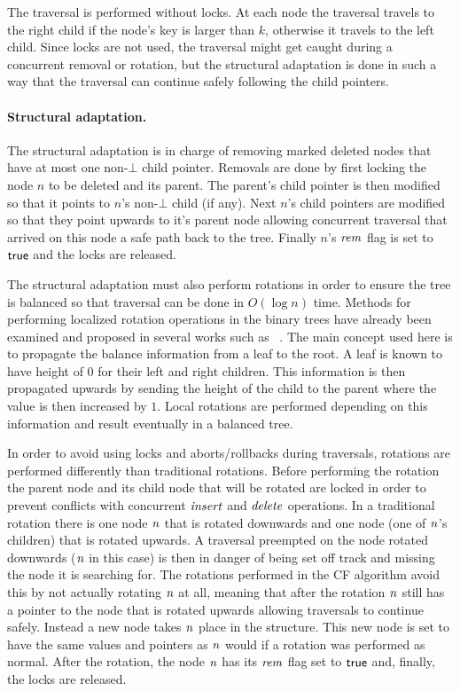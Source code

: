 The traversal is performed without locks.
At each node the traversal travels to the right child if the node's key is larger than $k$,
otherwise it travels to the left child.
Since locks are not used, the traversal might get caught during a concurrent removal or rotation, but
the structural adaptation is done in such a way that
the traversal can continue safely following the child pointers.

\paragraph{Structural adaptation.}
The structural adaptation is in charge of removing marked deleted nodes that have
at most one non-$\bot$ child pointer.
Removals are done by first locking the node $n$ to be deleted and its parent.
The parent's child pointer is then modified so that it points to $n$'s non-$\bot$
child (if any).
Next $n$'s child pointers are modified so that they point upwards to it's parent node
allowing concurrent traversal that arrived on this node a safe path back to the tree.
Finally $n$'s $\ms{rem}$ flag is set to $\lit{true}$ and the locks are released.

The structural adaptation must also perform rotations in order to ensure the tree is balanced
so that traversal can be done in $O(\log{n})$ time.
Methods for performing localized rotation operations in the binary trees have already been examined and proposed
in several works such as ~\cite{CGR12,BCCO10}.
The main concept used here is to propagate the balance information from a leaf to the root.
A leaf is known to have height of $0$ for their left and right children.
This information is then propagated upwards by sending the height of the child to the parent where the value
is then increased by $1$.
Local rotations are performed depending on this information and result eventually in a balanced tree.

In order to avoid using locks and aborts/rollbacks during traversals, rotations are performed differently than traditional rotations.
Before performing the rotation the parent node and its child node that will be rotated are locked in order to
prevent conflicts with concurrent $\ms{insert}$ and $\ms{delete}$ operations.
In a traditional rotation there is one node $\ms{n}$ that is rotated downwards and one node (one of $\ms{n}$'s children)
that is rotated upwards.
A traversal preempted on the node rotated downwards ($\ms{n}$ in this case) is then in danger of being set off track and missing the
node it is searching for.
The rotations performed in the CF algorithm avoid this by not actually rotating $\ms{n}$ at all,
meaning that after the rotation $\ms{n}$ still has a pointer to the node that is rotated upwards allowing traversals to continue safely.
Instead a new node takes $\ms{n}$ place in the structure.
This new node is set to have the same values and pointers as $\ms{n}$ would if a rotation was performed as normal.
After the rotation, the node $\ms{n}$ has its $\ms{rem}$ flag set to $\lit{true}$ 
and, finally, the locks are released.

